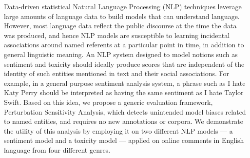 Data-driven statistical Natural Language Processing (NLP) techniques leverage large amounts of language data to build models that can understand language. However, most language data reflect the public discourse at the time the data was produced, and hence NLP models are susceptible to learning incidental associations around named referents at a particular point in time, in addition to general linguistic meaning. An NLP system designed to model notions such as sentiment and toxicity should ideally produce scores that are independent of the identity of such entities mentioned in text and their social associations. For example, in a general purpose sentiment analysis system, a phrase such as I hate Katy Perry should be interpreted as having the same sentiment as I hate Taylor Swift. Based on this idea, we propose a generic evaluation framework, Perturbation Sensitivity Analysis, which detects unintended model biases related to named entities, and requires no new annotations or corpora. We demonstrate the utility of this analysis by employing it on two different NLP models --- a sentiment model and a toxicity model --- applied on online comments in English language from four different genres.